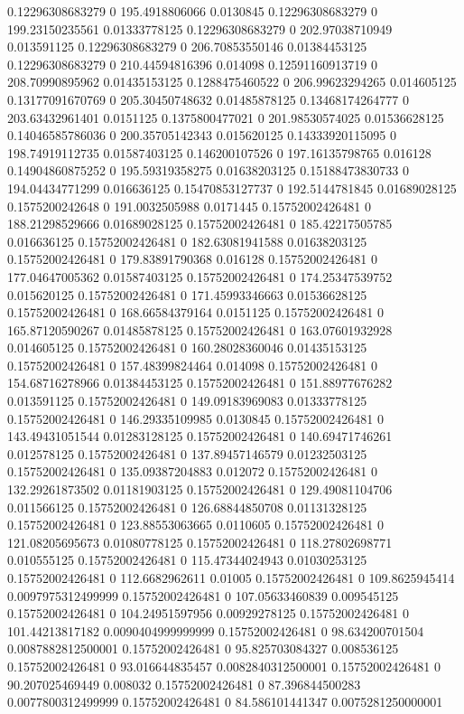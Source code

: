 0.12296308683279 0 195.4918806066 0.0130845
0.12296308683279 0 199.23150235561 0.01333778125
0.12296308683279 0 202.97038710949 0.013591125
0.12296308683279 0 206.70853550146 0.01384453125
0.12296308683279 0 210.44594816396 0.014098
0.12591160913719 0 208.70990895962 0.01435153125
0.1288475460522 0 206.99623294265 0.014605125
0.13177091670769 0 205.30450748632 0.01485878125
0.13468174264777 0 203.63432961401 0.0151125
0.1375800477021 0 201.98530574025 0.01536628125
0.14046585786036 0 200.35705142343 0.015620125
0.14333920115095 0 198.74919112735 0.01587403125
0.146200107526 0 197.16135798765 0.016128
0.14904860875252 0 195.59319358275 0.01638203125
0.15188473830733 0 194.04434771299 0.016636125
0.15470853127737 0 192.5144781845 0.01689028125
0.1575200242648 0 191.0032505988 0.0171445
0.15752002426481 0 188.21298529666 0.01689028125
0.15752002426481 0 185.42217505785 0.016636125
0.15752002426481 0 182.63081941588 0.01638203125
0.15752002426481 0 179.83891790368 0.016128
0.15752002426481 0 177.04647005362 0.01587403125
0.15752002426481 0 174.25347539752 0.015620125
0.15752002426481 0 171.45993346663 0.01536628125
0.15752002426481 0 168.66584379164 0.0151125
0.15752002426481 0 165.87120590267 0.01485878125
0.15752002426481 0 163.07601932928 0.014605125
0.15752002426481 0 160.28028360046 0.01435153125
0.15752002426481 0 157.48399824464 0.014098
0.15752002426481 0 154.68716278966 0.01384453125
0.15752002426481 0 151.88977676282 0.013591125
0.15752002426481 0 149.09183969083 0.01333778125
0.15752002426481 0 146.29335109985 0.0130845
0.15752002426481 0 143.49431051544 0.01283128125
0.15752002426481 0 140.69471746261 0.012578125
0.15752002426481 0 137.89457146579 0.01232503125
0.15752002426481 0 135.09387204883 0.012072
0.15752002426481 0 132.29261873502 0.01181903125
0.15752002426481 0 129.49081104706 0.011566125
0.15752002426481 0 126.68844850708 0.01131328125
0.15752002426481 0 123.88553063665 0.0110605
0.15752002426481 0 121.08205695673 0.01080778125
0.15752002426481 0 118.27802698771 0.010555125
0.15752002426481 0 115.47344024943 0.01030253125
0.15752002426481 0 112.6682962611 0.01005
0.15752002426481 0 109.8625945414 0.0097975312499999
0.15752002426481 0 107.05633460839 0.009545125
0.15752002426481 0 104.24951597956 0.00929278125
0.15752002426481 0 101.44213817182 0.0090404999999999
0.15752002426481 0 98.634200701504 0.0087882812500001
0.15752002426481 0 95.825703084327 0.008536125
0.15752002426481 0 93.016644835457 0.0082840312500001
0.15752002426481 0 90.207025469449 0.008032
0.15752002426481 0 87.396844500283 0.0077800312499999
0.15752002426481 0 84.586101441347 0.0075281250000001
